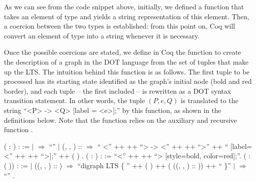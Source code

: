 As we can see from the code snippet above, initially, we defined a function that takes an element of type  and yields a string representation of this element. Then, a coercion between the two types is established: from this point on, Coq will convert an element of type  into a string whenever it is necessary.

Once the possible coercions are stated, we define in Coq the function  to create the description of a graph in the DOT language from the set of tuples that make up the LTS. The intuition behind this function is as follows. The first tuple to be processed has its starting state identified as the graph's initial node (bold and red border), and each tuple -- the first included -- is rewritten as a DOT syntax transition statement. In other words, the tuple $(P, e, Q)$ is translated to the string ``<P> -> <Q> [label = <e>];'' by this function, as shown in the definitions below. Note that the function  relies on the auxiliary and recursive function .

\begin{coqdoccode}
	\coqdocnoindent
	  ( :  ) :  :=\coqdoceol
	\coqdocindent{1.00em}
	  \coqdoceol
	\coqdocindent{1.00em}
	\ensuremath{|}  \ensuremath{\Rightarrow} ``''\coqdoceol
	\coqdocindent{1.00em}
	\ensuremath{|} (, , ) ::  \ensuremath{\Rightarrow} `` <'' ++  ++ ``> -> <'' ++  ++ ``>'' ++\coqdoceol
	\coqdocindent{9.30em}`` [label=<'' ++  ++ ``>];'' ++ ( )\coqdoceol
	\coqdocindent{1.00em}
	.\coqdoceol
	\coqdocemptyline
	\coqdocnoindent
	  ( : ) :  :=\coqdoceol
	\coqdocindent{1.00em} ``<'' ++  ++ ``> [style=bold, color=red];''.\coqdoceol
	\coqdocemptyline
	\coqdocnoindent
	  ( :  ( )) :  :=\coqdoceol
	\coqdocindent{1.00em}
	  \coqdoceol
	\coqdocindent{1.00em}
	\ensuremath{|}  ((, , ) :: ) \ensuremath{\Rightarrow}\coqdoceol
	\coqdocindent{2.00em}
	``digraph LTS \{ '' ++ ( ) ++\coqdoceol
	\coqdocindent{2.00em} ( ((, , ) :: )) ++ `` \}''\coqdoceol
	\coqdocindent{1.00em}
	\ensuremath{|} \coqdocvar{\_} \ensuremath{\Rightarrow} ``''\coqdoceol
	\coqdocindent{1.00em}
	.\coqdoceol
\end{coqdoccode}

